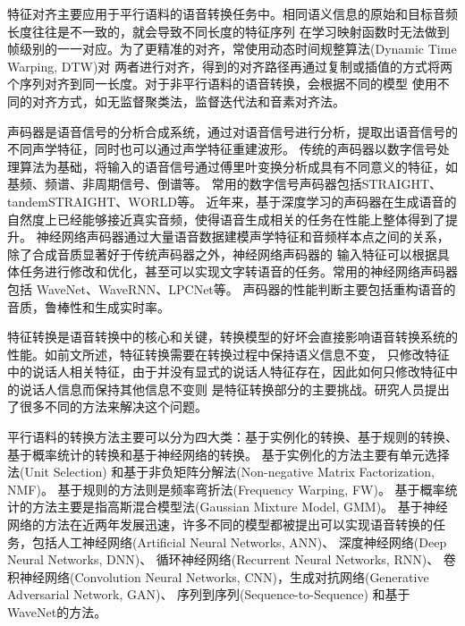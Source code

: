特征对齐主要应用于平行语料的语音转换任务中。相同语义信息的原始和目标音频长度往往是不一致的，就会导致不同长度的特征序列
在学习映射函数时无法做到帧级别的一一对应。为了更精准的对齐，常使用动态时间规整算法(Dynamic Time Warping, DTW)对
两者进行对齐，得到的对齐路径再通过复制或插值的方式将两个序列对齐到同一长度。对于非平行语料的语音转换，会根据不同的模型
使用不同的对齐方式，如无监督聚类法\cite{sundermann2003vtln}，监督迭代法\cite{erro2009inca}和音素对齐法\cite{ye2004voice}。

声码器是语音信号的分析合成系统，通过对语音信号进行分析，提取出语音信号的不同声学特征，同时也可以通过声学特征重建波形。
传统的声码器以数字信号处理算法为基础，将输入的语音信号通过傅里叶变换分析成具有不同意义的特征，如基频、频谱、非周期信号、倒谱等。
常用的数字信号声码器包括STRAIGHT\cite{kawahara1997speech}、tandemSTRAIGHT\cite{kawahara2008tandem}、WORLD\cite{morise2016world}等。
近年来，基于深度学习的声码器在生成语音的自然度上已经能够接近真实音频，使得语音生成相关的任务在性能上整体得到了提升。
神经网络声码器通过大量语音数据建模声学特征和音频样本点之间的关系，除了合成音质显著好于传统声码器之外，神经网络声码器的
输入特征可以根据具体任务进行修改和优化，甚至可以实现文字转语音的任务。常用的神经网络声码器包括
WaveNet\cite{oord2016wavenet,tamamori2017speaker,oord2017parallel}、WaveRNN\cite{kalchbrenner2018efficient}、LPCNet\cite{valin2019lpcnet}等。
声码器的性能判断主要包括重构语音的音质，鲁棒性和生成实时率。

特征转换是语音转换中的核心和关键，转换模型的好坏会直接影响语音转换系统的性能。如前文所述，特征转换需要在转换过程中保持语义信息不变，
只修改特征中的说话人相关特征，由于并没有显式的说话人特征存在，因此如何只修改特征中的说话人信息而保持其他信息不变则
是特征转换部分的主要挑战。研究人员提出了很多不同的方法来解决这个问题。

平行语料的转换方法主要可以分为四大类：基于实例化的转换、基于规则的转换、基于概率统计的转换和基于神经网络的转换。
基于实例化的方法主要有单元选择法(Unit Selection)\cite{shuang2008voice,sundermann2006text,wu2013exemplar}
和基于非负矩阵分解法(Non-negative Matrix Factorization, NMF)\cite{takashima2012exemplar,wu2014exemplar,zhang2015regularized}。
基于规则的方法则是频率弯折法(Frequency Warping, FW)\cite{shuang2008voice,erro2009voice,tian2015sparse,Toda2001Voice}。
基于概率统计的方法主要是指高斯混合模型法(Gaussian Mixture Model, GMM)\cite{chen2003voice,kain1998spectral,kobayashi2016nu,stylianou1998continuous}。
基于神经网络的方法在近两年发展迅速，许多不同的模型都被提出可以实现语音转换的任务，包括人工神经网络(Artificial Neural Networks, ANN)\cite{desai2010spectral}、
深度神经网络(Deep Neural Networks, DNN)\cite{aryal2015articulatory,chen2014voice}、
循环神经网络(Recurrent Neural Networks, RNN)\cite{nakashika2015voice,sun2015voice}、
卷积神经网络(Convolution Neural Networks, CNN)\cite{kaneko2017sequence}，生成对抗网络(Generative Adversarial Network, GAN)\cite{hsu2017voice,kaneko2017sequence}、
序列到序列(Sequence-to-Sequence)\cite{kameoka2018convs2s,tanaka2019atts2s,zhang2019improving}
和基于WaveNet的方法\cite{polyak2019attention}。

